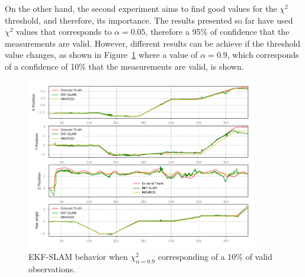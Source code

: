 On the other hand, the second experiment aims to find good values for the $\chi^2$ threshold, and therefore, its importance. The results presented so far have used $\chi^2$ values that corresponds to $\alpha=0.05$, therefore a 95\% of confidence that the measurements are valid. However, different results can be achieve if the threshold value changes, as shown in Figure~\ref{fig:chapter3:simulation:d:nees-10} where a value of $\alpha=0.9$, which corresponds of a confidence of 10\% that the measurements are valid, is shown.\\
\begin{figure}
    \centering
    \includegraphics[width=0.9\textwidth]{Images/fig24-nees-10-path.png}
    \caption[EKF-SLAM behavior when $\chi_{\alpha=0.9}^2$]{EKF-SLAM behavior when $\chi_{\alpha=0.9}^2$ corresponding of a 10\% of valid observations.}
    \label{fig:chapter3:simulation:d:nees-10}
\end{figure}

